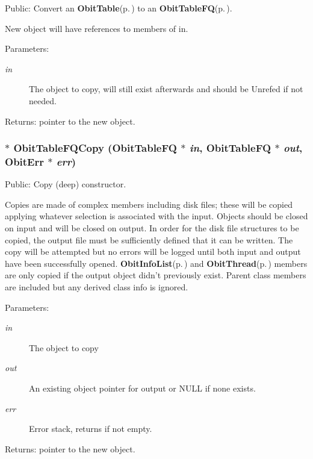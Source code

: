 Public: Convert an {\bf Obit\-Table}{\rm (p.\,\pageref{structObitTable})} to an {\bf Obit\-Table\-FQ}{\rm (p.\,\pageref{structObitTableFQ})}. 

New object will have references to members of in. \begin{Desc}
\item[Parameters:]
\begin{description}
\item[{\em in}]The object to copy, will still exist afterwards and should be Unrefed if not needed. \end{description}
\end{Desc}
\begin{Desc}
\item[Returns:]pointer to the new object. \end{Desc}
\subsubsection{$\ast$ Obit\-Table\-FQCopy ({\bf Obit\-Table\-FQ} $\ast$ {\em in}, {\bf Obit\-Table\-FQ} $\ast$ {\em out}, {\bf Obit\-Err} $\ast$ {\em err})}\label{ObitTableFQ_8h_a14}


Public: Copy (deep) constructor. 

Copies are made of complex members including disk files; these will be copied applying whatever selection is associated with the input. Objects should be closed on input and will be closed on output. In order for the disk file structures to be copied, the output file must be sufficiently defined that it can be written. The copy will be attempted but no errors will be logged until both input and output have been successfully opened. {\bf Obit\-Info\-List}{\rm (p.\,\pageref{structObitInfoList})} and {\bf Obit\-Thread}{\rm (p.\,\pageref{structObitThread})} members are only copied if the output object didn't previously exist. Parent class members are included but any derived class info is ignored. \begin{Desc}
\item[Parameters:]
\begin{description}
\item[{\em in}]The object to copy \item[{\em out}]An existing object pointer for output or NULL if none exists. \item[{\em err}]Error stack, returns if not empty. \end{description}
\end{Desc}
\begin{Desc}
\item[Returns:]pointer to the new object. \end{Desc}
